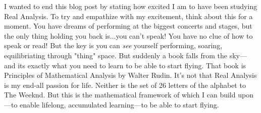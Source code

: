 \documentclass[12pt]{article}
\theoremstyle{definition} %
\theoremstyle{plain} %
\begin{document}
I wanted to end this blog post by stating how excited I am to have been studying Real Analysis. To try and empathize with my excitement, think about this for a moment. You have dreams of performing at the 
biggest concerts and stages, but the only thing holding you back is...you can't speak! You have no clue of how to speak or read! But the key is you can \emph{see} yourself performing, soaring, equilibriating through "thing" space. But suddenly a book falls from the sky—
and its exactly what you need to learn to be able to start flying. That book is Principles of Mathematical Analysis by Walter Rudin. It's not that Real Analysis is my end-all passion for life. Neither is the set of 26 letters of the alphabet to The Weeknd. But this is the mathematical framework of which I can build upon—to enable lifelong, accumulated learning—to be able to start flying.
\end{document}
